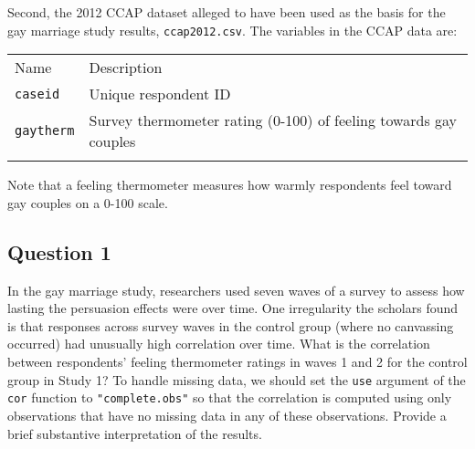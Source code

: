 \documentclass[]{article}
\begin{document}
Second, the 2012 CCAP dataset alleged to have been used as the basis for
the gay marriage study results, \texttt{ccap2012.csv}. The variables in
the CCAP data are:

\begin{longtable}[c]{@{}ll@{}}
\toprule\addlinespace
\begin{minipage}[b]{0.25\columnwidth}\raggedright
Name
\end{minipage} & \begin{minipage}[b]{0.68\columnwidth}\raggedright
Description
\end{minipage}
\\\addlinespace
\midrule\endhead
\begin{minipage}[t]{0.25\columnwidth}\raggedright
\texttt{caseid}
\end{minipage} & \begin{minipage}[t]{0.68\columnwidth}\raggedright
Unique respondent ID
\end{minipage}
\\\addlinespace
\begin{minipage}[t]{0.25\columnwidth}\raggedright
\texttt{gaytherm}
\end{minipage} & \begin{minipage}[t]{0.68\columnwidth}\raggedright
Survey thermometer rating (0-100) of feeling towards gay couples
\end{minipage}
\\\addlinespace
\bottomrule
\end{longtable}

Note that a feeling thermometer measures how warmly respondents feel
toward gay couples on a 0-100 scale.

\subsection{Question 1}\label{question-1}

In the gay marriage study, researchers used seven waves of a survey to
assess how lasting the persuasion effects were over time. One
irregularity the scholars found is that responses across survey waves in
the control group (where no canvassing occurred) had unusually high
correlation over time. What is the correlation between respondents'
feeling thermometer ratings in waves 1 and 2 for the control group in
Study 1? To handle missing data, we should set the \texttt{use} argument
of the \texttt{cor} function to \texttt{"complete.obs"} so that the
correlation is computed using only observations that have no missing
data in any of these observations. Provide a brief substantive
interpretation of the results.
\end{document}
